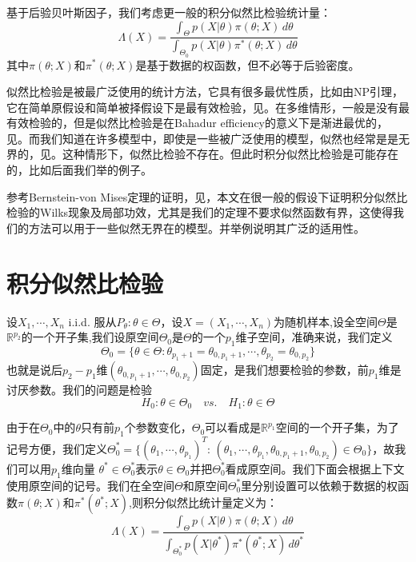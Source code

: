 \documentclass[review]{elsarticle}
\begin{document}
基于后验贝叶斯因子，我们考虑更一般的积分似然比检验统计量：
\begin{equation}
    \Lambda (X)=\frac{\int_{\Theta} p(X|\theta)\pi(\theta;X)\,d\theta}{\int_{\Theta_0} p(X|\theta)\pi^*(\theta;X)\,d\theta}
\end{equation}
其中$\pi(\theta;X)$和$\pi^*(\theta;X)$是基于数据的权函数，但不必等于后验密度。

似然比检验是被最广泛使用的统计方法，它具有很多最优性质，比如由NP引理，它在简单原假设和简单被择假设下是最有效检验，见\cite{Lehmann}。在多维情形，一般是没有最有效检验的，但是似然比检验是在Bahadur efficiency的意义下是渐进最优的，见\cite{MR0315820}。而我们知道在许多模型中，即使是一些被广泛使用的模型，似然也经常是是无界的，见\cite{Cam1990Maximum}。这种情形下，似然比检验不存在。但此时积分似然比检验是可能存在的，比如后面我们举的例子。

参考Bernstein-von Mises定理的证明，见\cite{van2000asymptotic}，本文在很一般的假设下证明积分似然比检验的Wilks现象及局部功效，尤其是我们的定理不要求似然函数有界，这使得我们的方法可以用于一些似然无界在的模型。并举例说明其广泛的适用性。

\section{积分似然比检验}

设$X_1,\cdots,X_n$ i.i.d. 服从$P_{\theta}:\theta\in\Theta$，设$X=(X_1,\cdots,X_n)$为随机样本,设全空间$\Theta$是$\mathbb{R}^{p_2}$的一个开子集,我们设原空间$\Theta_0$是$\Theta$的一个$p_1$维子空间，准确来说，我们定义
\begin{equation}
    \Theta_0=\{\theta\in\Theta:\theta_{p_1+1}=\theta_{0,{p_1+1}},\cdots,\theta_{p_2}=\theta_{0,{p_2}}\} 
\end{equation}
也就是说后$p_2-p_1$维$(\theta_{0,{p_1+1}},\cdots,\theta_{0,{p_2}})$固定，是我们想要检验的参数，前$p_1$维是讨厌参数。我们的问题是检验
\begin{equation}
H_0:\theta\in \Theta_0\quad vs. \quad H_1:\theta\in \Theta
\end{equation}

由于在$\Theta_0$中的$\theta$只有前$p_1$个参数变化，$\Theta_0$可以看成是$\mathbb{R}^{p_1}$空间的一个开子集，为了记号方便，我们定义$\Theta^*_0=\{(\theta_1,\cdots,\theta_{p_1})^T:\, (\theta_1,\cdots,\theta_{p_1},\theta_{0,p_1+1},\theta_{0,p_2})\in \Theta_0\}$，故我们可以用$p_1$维向量 $\theta^*\in
\Theta_0^*$表示$\theta\in\Theta_0$并把$\Theta_0^*$看成原空间。我们下面会根据上下文使用原空间的记号。我们在全空间$\Theta$和原空间$\Theta_0^*$里分别设置可以依赖于数据的权函数$\pi(\theta;X)$和$\pi^*(\theta^*;X)$,则积分似然比统计量定义为：
\begin{equation}\label{likelihoodRatio}
    \Lambda (X)=\frac{\int_{\Theta} p(X|\theta)\pi(\theta;X)\,d\theta}{\int_{\Theta^*_0} p(X|\theta^*)\pi^*(\theta^*;X)\,d\theta^*}
\end{equation}
\end{document}
